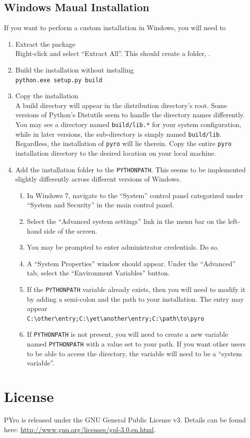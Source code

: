 \subsection{Windows Maual Installation}
If you want to perform a custom installation in Windows, you will need to
\begin{enumerate}
\item Extract the package\\
Right-click and select ``Extract All''.  This should create a folder, \texttt{\package}.
\item Build the installation without installing\\
\texttt{python.exe setup.py build}\\
\item Copy the installation\\
A build directory will appear in the distribution directory's root.  Some versions of Python's Distutils seem to handle the directory names differently.  You may see a directory named \verb|build/lib.*| for your system configuration, while in later versions, the sub-directory is simply named \verb|build/lib|.  Regardless, the installation of \verb|pyro| will lie therein.  Copy the entire \verb|pyro| installation directory to the desired location on your local machine.
\item Add the installation folder to the \verb|PYTHONPATH|.  This seems to be implemented slightly differently across different versions of Windows.  
\begin{enumerate}
\item In Windows 7, navigate to the ``System'' control panel categorized under ``System and Security'' in the main control panel.  
\item Select the ``Advanced system settings'' link in the menu bar on the left-hand side of the screen. 
\item You may be prompted to enter administrator credentials.  Do so.
\item A ``System Properties'' window should appear.  Under the ``Advanced'' tab, select the ``Environment Variables'' button.
\item	If the \verb|PYTHONPATH| variable already exists, then you will need to modify it by adding a semi-colon and the path to your installation.  The entry may appear\\
\verb|C:\other\entry;C:\yet\another\entry;C:\path\to\pyro|
\item If \verb|PYTHONPATH| is not present, you will need to create a new variable named \verb|PYTHONPATH| with a value set to your path.  If you want other users to be able to access the directory, the variable will need to be a ``system variable''.
\end{enumerate}
\end{enumerate}


\section{License}
PYro is released under the GNU General Public License v3.  Details can be found here: \url{http://www.gnu.org/licenses/gpl-3.0.en.html}.
